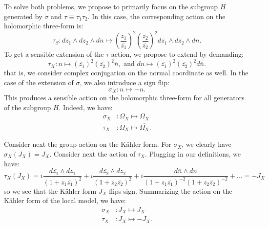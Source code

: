 \documentclass[12pt]{article}%
\numberwithin{equation}{section}
\renewcommand{\(}{\left(}
\renewcommand{\)}{\right)}
\renewcommand{\[}{\left[}
\renewcommand{\]}{\right]}
\begin{document}
To solve both problems, we propose to primarily focus on the subgroup $H$
generated by $\sigma$ and $\tau\equiv\tau_{1}\tau_{2}$. In this case, the
corresponding action on the holomorphic three-form is:%
\begin{equation}
\tau_{S}:dz_{1}\wedge dz_{2}\wedge dn\mapsto\left(  \frac{z_{1}}%
{\overline{z_{1}}}\right)  ^{2}\left(  \frac{z_{2}}{\overline{z_{2}}}\right)
^{2}d\overline{z_{1}}\wedge d\overline{z_{2}}\wedge dn.
\end{equation}
To get a sensible extension of the $\tau$ action, we propose to extend by
demanding:%
\begin{equation}
\tau_{X}:n\mapsto\left(  \overline{z_{1}}\right)  ^{2}\left(  \overline{z_{2}%
}\right)  ^{2}\overline{n},\text{ \ \ and \ \ }dn\mapsto\left(  \overline
{z_{1}}\right)  ^{2}\left(  \overline{z_{2}}\right)  ^{2}d\overline{n}.
\end{equation}
that is, we consider complex conjugation on the normal coordinate as well. In
the case of the extension of $\sigma$, we also introduce a sign flip:%
\begin{equation}
\sigma_{X}:n\mapsto-n.
\end{equation}
This produces a sensible action on the holomorphic three-form for all
generators of the subgroup $H$. Indeed, we have:%
\begin{align}
\sigma_{X}  &  :\Omega_{X}\mapsto\Omega_{X}\\
\tau_{X}  &  :\Omega_{X}\mapsto\overline{\Omega_{X}}\text{.}%
\end{align}


Consider next the group action on the K\"ahler form. For $\sigma_{X}$, we
clearly have $\sigma_{X}(J_{X})=J_{X}$. Consider next the action of $\tau_{X}%
$. Plugging in our definitions, we have:%
\begin{equation}
\tau_{X}(J_{X})=i\frac{d\overline{z_{1}}\wedge dz_{1}}{(1+z_{1}\overline
{z_{1}})^{2}}+i\frac{d\overline{z_{2}}\wedge dz_{2}}{(1+z_{2}\overline{z_{2}%
})^{2}}+i\frac{d\overline{n}\wedge dn}{(1+z_{1}\overline{z_{1}})^{-2}%
(1+z_{2}\overline{z_{2}})^{-2}}+...=-J_{X}%
\end{equation}
so we see that the K\"ahler form $J_{X}$ flips sign. Summarizing the action on
the K\"ahler form of the local model, we have:%
\begin{align}
\sigma_{X} &  :J_{X}\mapsto J_{X}\\
\tau_{X} &  :J_{X}\mapsto-J_{X}\text{.}%
\end{align}
\end{document}
